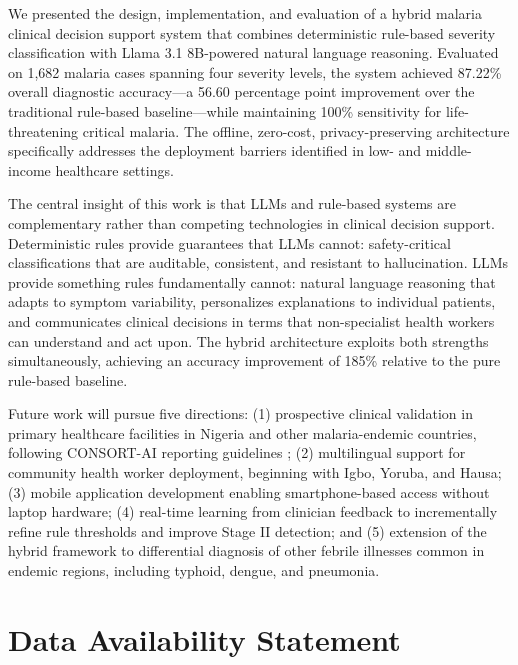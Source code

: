 \documentclass[12pt,a4paper]{article}
\begin{document}
We presented the design, implementation, and evaluation of a hybrid malaria clinical decision support system that combines deterministic rule-based severity classification with Llama 3.1 8B-powered natural language reasoning. Evaluated on 1,682 malaria cases spanning four severity levels, the system achieved 87.22\% overall diagnostic accuracy---a 56.60 percentage point improvement over the traditional rule-based baseline---while maintaining 100\% sensitivity for life-threatening critical malaria. The offline, zero-cost, privacy-preserving architecture specifically addresses the deployment barriers identified in low- and middle-income healthcare settings.

The central insight of this work is that LLMs and rule-based systems are complementary rather than competing technologies in clinical decision support. Deterministic rules provide guarantees that LLMs cannot: safety-critical classifications that are auditable, consistent, and resistant to hallucination. LLMs provide something rules fundamentally cannot: natural language reasoning that adapts to symptom variability, personalizes explanations to individual patients, and communicates clinical decisions in terms that non-specialist health workers can understand and act upon. The hybrid architecture exploits both strengths simultaneously, achieving an accuracy improvement of 185\% relative to the pure rule-based baseline.

Future work will pursue five directions: (1) prospective clinical validation in primary healthcare facilities in Nigeria and other malaria-endemic countries, following CONSORT-AI reporting guidelines \cite{ref29}; (2) multilingual support for community health worker deployment, beginning with Igbo, Yoruba, and Hausa; (3) mobile application development enabling smartphone-based access without laptop hardware; (4) real-time learning from clinician feedback to incrementally refine rule thresholds and improve Stage II detection; and (5) extension of the hybrid framework to differential diagnosis of other febrile illnesses common in endemic regions, including typhoid, dengue, and pneumonia.


\section*{Data Availability Statement}
\end{document}
